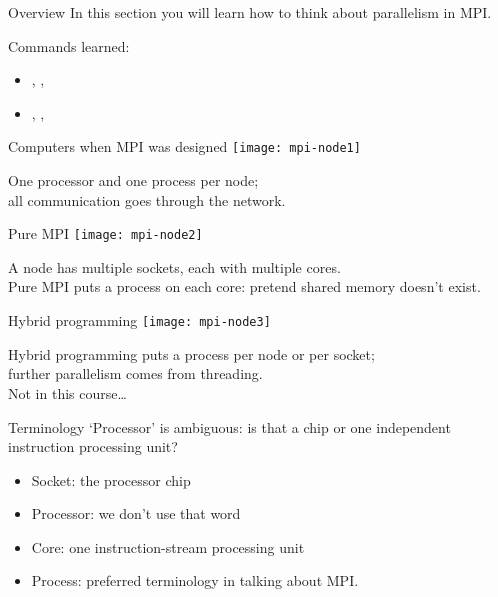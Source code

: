 
\begin{numberedframe}{Overview}
  In this section you will learn how to think about parallelism in
  MPI.

  Commands learned:
  \begin{itemize}
  \item
    , ,
  \item 
    , ,
  \end{itemize}
\end{numberedframe}


\begin{numberedframe}{Computers when MPI was designed}
  \texttt{[image: mpi-node1]}

  One processor and one  process per node;\\
  all communication goes through the network.
\end{numberedframe}

\begin{numberedframe}
  {Pure MPI}
  \texttt{[image: mpi-node2]}

  A node has multiple sockets, each with multiple cores.\\
  Pure MPI puts a process on each core: pretend shared memory doesn't exist.
\end{numberedframe}

\begin{numberedframe}
  {Hybrid programming}
  \texttt{[image: mpi-node3]}

  Hybrid programming puts a process per node or per socket;\\
  further parallelism comes from threading.\\
  Not in this course\ldots
\end{numberedframe}

\begin{numberedframe}{Terminology}
  `Processor' is ambiguous: is that a chip or one independent
  instruction processing unit?
  \begin{itemize}
  \item Socket: the processor chip
  \item Processor: we don't use that word
  \item Core: one instruction-stream processing unit
  \item Process: preferred terminology in talking about MPI.
  \end{itemize}  
\end{numberedframe}

